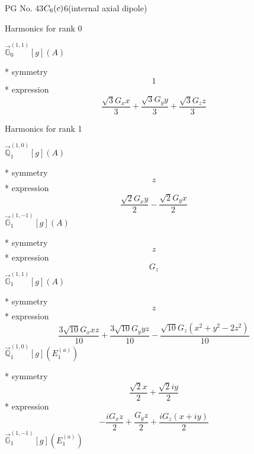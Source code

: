 \documentclass[fleqn,8pt]{jsarticle}
\begin{document}
\setcounter{MaxMatrixCols}{32}

\renewcommand{\tablename}{Table~}
\renewcommand{\figurename}{Figure~}
\begin{center}
\LARGE
PG No. 43\quad$C_{\rm 6}(c)$\quad$6$\quad[ hexagonal ] (internal axial dipole)
\end{center}

\noindent * Harmonics for rank 0

\noindent\quad $\vec{\mathbb{G}}_{0}^{(1,1)}[g](A)$

\noindent\quad ** symmetry
\begin{dmath*}
1
\end{dmath*}
\noindent\quad ** expression
\begin{dmath*}
\frac{\sqrt{3} G_{x} x}{3} + \frac{\sqrt{3} G_{y} y}{3} + \frac{\sqrt{3} G_{z} z}{3}
\end{dmath*}

\noindent * Harmonics for rank 1

\noindent\quad $\vec{\mathbb{Q}}_{1}^{(1,0)}[g](A)$

\noindent\quad ** symmetry
\begin{dmath*}
z
\end{dmath*}
\noindent\quad ** expression
\begin{dmath*}
\frac{\sqrt{2} G_{x} y}{2} - \frac{\sqrt{2} G_{y} x}{2}
\end{dmath*}
\noindent\quad $\vec{\mathbb{G}}_{1}^{(1,-1)}[g](A)$

\noindent\quad ** symmetry
\begin{dmath*}
z
\end{dmath*}
\noindent\quad ** expression
\begin{dmath*}
G_{z}
\end{dmath*}
\noindent\quad $\vec{\mathbb{G}}_{1}^{(1,1)}[g](A)$

\noindent\quad ** symmetry
\begin{dmath*}
z
\end{dmath*}
\noindent\quad ** expression
\begin{dmath*}
\frac{3 \sqrt{10} G_{x} x z}{10} + \frac{3 \sqrt{10} G_{y} y z}{10} - \frac{\sqrt{10} G_{z} \left(x^{2} + y^{2} - 2 z^{2}\right)}{10}
\end{dmath*}
\noindent\quad $\vec{\mathbb{Q}}_{1}^{(1,0)}[g](E_{1}^{(a)})$

\noindent\quad ** symmetry
\begin{dmath*}
\frac{\sqrt{2} x}{2} + \frac{\sqrt{2} i y}{2}
\end{dmath*}
\noindent\quad ** expression
\begin{dmath*}
- \frac{i G_{x} z}{2} + \frac{G_{y} z}{2} + \frac{i G_{z} \left(x + i y\right)}{2}
\end{dmath*}
\noindent\quad $\vec{\mathbb{G}}_{1}^{(1,-1)}[g](E_{1}^{(a)})$
\end{document}
